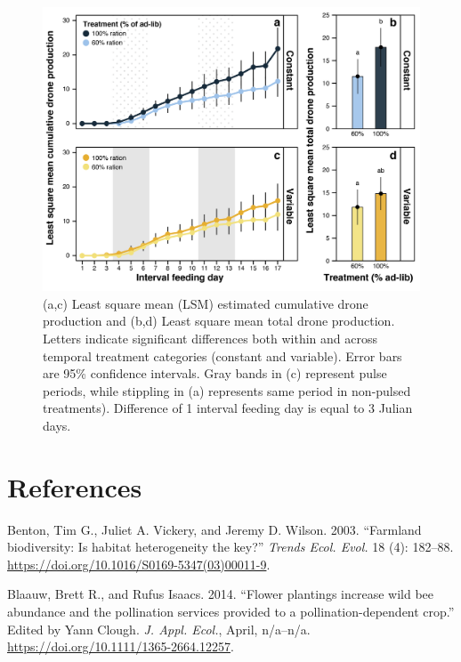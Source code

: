 \documentclass[11pt,]{article}
\begin{document}
\begin{figure}
\centering
\includegraphics{./fig4_drones.png}
\caption{(a,c) Least square mean (LSM) estimated cumulative drone
production and (b,d) Least square mean total drone production. Letters
indicate significant differences both within and across temporal
treatment categories (constant and variable). Error bars are 95\%
confidence intervals. Gray bands in (c) represent pulse periods, while
stippling in (a) represents same period in non-pulsed treatments).
Difference of 1 interval feeding day is equal to 3 Julian days.}
\end{figure}

\clearpage

\newpage

\hypertarget{references}{%
\section*{References}\label{references}}

\hypertarget{refs}{}
\leavevmode\hypertarget{ref-Benton2003}{}%
Benton, Tim G., Juliet A. Vickery, and Jeremy D. Wilson. 2003.
``Farmland biodiversity: Is habitat heterogeneity the key?''
\emph{Trends Ecol. Evol.} 18 (4): 182--88.
\url{https://doi.org/10.1016/S0169-5347(03)00011-9}.

\leavevmode\hypertarget{ref-Blaauw2014}{}%
Blaauw, Brett R., and Rufus Isaacs. 2014. ``Flower plantings increase
wild bee abundance and the pollination services provided to a
pollination-dependent crop.'' Edited by Yann Clough. \emph{J. Appl.
Ecol.}, April, n/a--n/a. \url{https://doi.org/10.1111/1365-2664.12257}.
\end{document}
